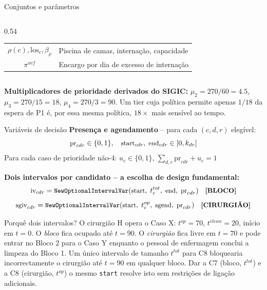 \documentclass[10pt,aspectratio=169]{beamer}
\begin{document}
\begin{frame}{Conjuntos e par\^ametros}
\begin{columns}
\begin{column}{0.54\textwidth}
\begin{center}
\begin{tabular}{cl}
        $\rho(c),\text{los}_c,\beta_\rho$ & Piscina de camas, interna\c{c}\~ao, capacidade \\
        $\pi^{ovf}$ & Encargo por dia de excesso de interna\c{c}\~ao \\
        \bottomrule
      \end{tabular}
      \end{center}
    \end{column}
  \end{columns}
  \vspace{0.3em}
  \footnotesize\textbf{Multiplicadores de prioridade derivados do SIGIC:}
  $\mu_2=270/60=4.5$,\; $\mu_3=270/15=18$,\; $\mu_4=270/3=90$.
  Um tier cuja pol\'itica permite apenas $1/18$ da espera de P1
  \'e, por essa mesma pol\'itica, $18\times$ mais sens\'ivel ao tempo.
\end{frame}

\begin{frame}{Vari\'aveis de decis\~ao}
  \textbf{Presen\c{c}a e agendamento} -- para cada $(c,d,r)$ eleg\'ivel:
  \[\small
    \text{pr}_{cdr}\in\{0,1\},\quad
    \text{start}_{cdr},\;\text{end}_{cdr}\in[0,k_{dr}]
  \]
  Para cada caso de prioridade n\~ao-4: $u_c\in\{0,1\}$,\quad
  $\sum_{d,r}\text{pr}_{cdr}+u_c=1$

  \vspace{0.3em}
  \textbf{Dois intervalos por candidato -- a escolha de design fundamental:}
  \[\small
    \text{iv}_{cdr}=\texttt{NewOptionalIntervalVar}(\text{start},\;t_c^{tot},\;\text{end},\;\text{pr}_{cdr})
    \quad\textbf{[BLOCO]}
  \]
  \[\small
    \text{sgiv}_{cdr}=\texttt{NewOptionalIntervalVar}(\text{start},\;t_c^{op},\;\text{sgend},\;\text{pr}_{cdr})
    \quad\textbf{[CIRURGI\~AO]}
  \]
  \begin{block}{Porqu\^e dois intervalos?}
    \small O cirurgi\~ao H opera o Caso X: $t^{op}=70$, $t^{clean}=20$,
    in\'icio em $t=0$. O \emph{bloco} fica ocupado at\'e $t=90$.
    O \emph{cirurgi\~ao} fica livre em $t=70$ e pode entrar no Bloco 2
    para o Caso Y enquanto o pessoal de enfermagem conclui a limpeza
    do Bloco 1. Um \'unico intervalo de tamanho $t^{tot}$ para C8
    bloquearia incorrectamente o cirurgi\~ao at\'e $t=90$ em qualquer
    bloco. Dar a C7 (bloco, $t^{tot}$) e a C8 (cirurgi\~ao, $t^{op}$)
    o mesmo \texttt{start} resolve isto sem restri\c{c}\~oes de
    liga\c{c}\~ao adicionais.
  \end{block}
\end{frame}
\end{document}
